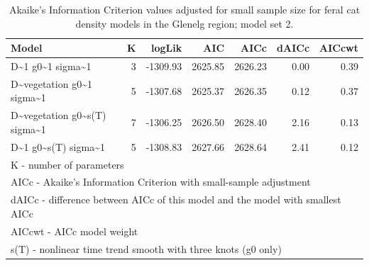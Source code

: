 \documentclass[preprint, 3p, authoryear]{elsarticle} %
\begin{document}
\newpage

\begingroup\fontsize{10}{12}\selectfont

\begin{longtable}[t]{lrrrrrr}
\caption{\label{tab:density-aic-g-2}Akaike's Information Criterion values adjusted for small sample size for feral cat density models in the Glenelg region; model set 2.}\\
\toprule
Model & K & logLik & AIC & AICc & dAICc & AICcwt\\
\midrule
D\textasciitilde{}1 g0\textasciitilde{}1 sigma\textasciitilde{}1 & 3 & -1309.93 & 2625.85 & 2626.23 & 0.00 & 0.39\\
D\textasciitilde{}vegetation g0\textasciitilde{}1 sigma\textasciitilde{}1 & 5 & -1307.68 & 2625.37 & 2626.35 & 0.12 & 0.37\\
D\textasciitilde{}vegetation g0\textasciitilde{}s(T) sigma\textasciitilde{}1 & 7 & -1306.25 & 2626.50 & 2628.40 & 2.16 & 0.13\\
D\textasciitilde{}1 g0\textasciitilde{}s(T) sigma\textasciitilde{}1 & 5 & -1308.83 & 2627.66 & 2628.64 & 2.41 & 0.12\\
\bottomrule
\multicolumn{7}{l}{\rule{0pt}{1em}K - number of parameters}\\
\multicolumn{7}{l}{\rule{0pt}{1em}AICc - Akaike's Information Criterion with small-sample adjustment}\\
\multicolumn{7}{l}{\rule{0pt}{1em}dAICc - difference between AICc of this model and the model with smallest AICc}\\
\multicolumn{7}{l}{\rule{0pt}{1em}AICcwt - AICc model weight}\\
\multicolumn{7}{l}{\rule{0pt}{1em}s(T) - nonlinear time trend smooth with three knots (g0 only)}\\
\end{longtable}
\endgroup{}

\newpage

\begingroup\fontsize{10}{12}\selectfont
\end{document}
